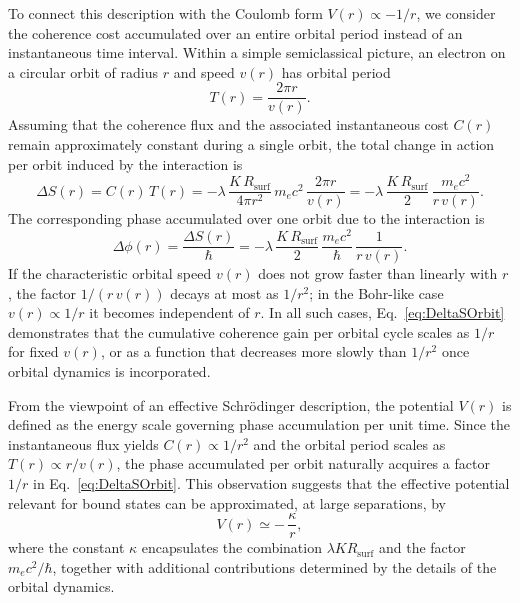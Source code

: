 \documentclass[11pt,a4paper]{article}
\begin{document}
To connect this description with the Coulomb form $V(r) \propto -1/r$, we consider the coherence cost accumulated over an entire orbital period instead of an instantaneous time interval. Within a simple semiclassical picture, an electron on a circular orbit of radius $r$ and speed $v(r)$ has orbital period
\begin{equation}
T(r) = \frac{2\pi r}{v(r)}.
\end{equation}
Assuming that the coherence flux and the associated instantaneous cost $C(r)$ remain approximately constant during a single orbit, the total change in action per orbit induced by the interaction is
\begin{equation}
\Delta S(r) = C(r)\,T(r) = -\lambda\,\frac{K\,R_{\mathrm{surf}}}{4\pi r^{2}}\,m_e c^{2}\,\frac{2\pi r}{v(r)} = -\lambda\,\frac{K\,R_{\mathrm{surf}}}{2}\,\frac{m_e c^{2}}{r\,v(r)}.
\label{eq:DeltaSOrbit}
\end{equation}
The corresponding phase accumulated over one orbit due to the interaction is
\begin{equation}
\Delta\phi(r) = \frac{\Delta S(r)}{\hbar} = -\lambda\,\frac{K\,R_{\mathrm{surf}}}{2}\,\frac{m_e c^{2}}{\hbar}\,\frac{1}{r\,v(r)}.
\end{equation}
If the characteristic orbital speed $v(r)$ does not grow faster than linearly with $r$, the factor $1/(r\,v(r))$ decays at most as $1/r^{2}$; in the Bohr-like case $v(r)\propto 1/r$ it becomes independent of $r$. In all such cases, Eq.~\eqref{eq:DeltaSOrbit} demonstrates that the cumulative coherence gain per orbital cycle scales as $1/r$ for fixed $v(r)$, or as a function that decreases more slowly than $1/r^{2}$ once orbital dynamics is incorporated.\par From the viewpoint of an effective Schr\"odinger description, the potential $V(r)$ is defined as the energy scale governing phase accumulation per unit time. Since the instantaneous flux yields $C(r)\propto 1/r^{2}$ and the orbital period scales as $T(r)\propto r/v(r)$, the phase accumulated per orbit naturally acquires a factor $1/r$ in Eq.~\eqref{eq:DeltaSOrbit}. This observation suggests that the effective potential relevant for bound states can be approximated, at large separations, by
\begin{equation}
V(r) \simeq -\,\frac{\kappa}{r},
\label{eq:VrCoulomb}
\end{equation}
where the constant $\kappa$ encapsulates the combination $\lambda K R_{\mathrm{surf}}$ and the factor $m_e c^{2}/\hbar$, together with additional contributions determined by the details of the orbital dynamics.
\end{document}
